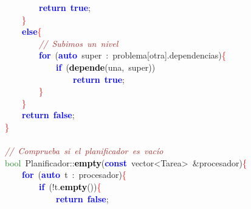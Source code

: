 \mbox{}\ \ \ \ \ \ \ \ \textbf{\textcolor{Blue}{return}}\ \textbf{\textcolor{Blue}{true}}\textcolor{BrickRed}{;} \\
\mbox{}\ \ \ \ \textcolor{Red}{\}} \\
\mbox{}\ \ \ \ \textbf{\textcolor{Blue}{else}}\textcolor{Red}{\{} \\
\mbox{}\ \ \ \ \ \ \ \ \textit{\textcolor{Brown}{//\ Subimos\ un\ nivel}} \\
\mbox{}\ \ \ \ \ \ \ \ \textbf{\textcolor{Blue}{for}}\ \textcolor{BrickRed}{(}\textbf{\textcolor{Blue}{auto}}\ super\ \textcolor{BrickRed}{:}\ problema\textcolor{BrickRed}{[}otra\textcolor{BrickRed}{].}dependencias\textcolor{BrickRed}{)}\textcolor{Red}{\{} \\
\mbox{}\ \ \ \ \ \ \ \ \ \ \ \ \textbf{\textcolor{Blue}{if}}\ \textcolor{BrickRed}{(}\textbf{\textcolor{Black}{depende}}\textcolor{BrickRed}{(}una\textcolor{BrickRed}{,}\ super\textcolor{BrickRed}{))} \\
\mbox{}\ \ \ \ \ \ \ \ \ \ \ \ \ \ \ \ \textbf{\textcolor{Blue}{return}}\ \textbf{\textcolor{Blue}{true}}\textcolor{BrickRed}{;} \\
\mbox{}\ \ \ \ \ \ \ \ \textcolor{Red}{\}} \\
\mbox{}\ \ \ \ \textcolor{Red}{\}} \\
\mbox{}\ \ \ \ \textbf{\textcolor{Blue}{return}}\ \textbf{\textcolor{Blue}{false}}\textcolor{BrickRed}{;} \\
\mbox{}\textcolor{Red}{\}} \\
\mbox{} \\
\mbox{}\textit{\textcolor{Brown}{//\ Comprueba\ si\ el\ planificador\ es\ vacío}} \\
\mbox{}\textcolor{ForestGreen}{bool}\ Planificador\textcolor{BrickRed}{::}\textbf{\textcolor{Black}{empty}}\textcolor{BrickRed}{(}\textbf{\textcolor{Blue}{const}}\ \textcolor{TealBlue}{vector\textless{}Tarea\textgreater{}}\ \textcolor{BrickRed}{\&}procesador\textcolor{BrickRed}{)}\textcolor{Red}{\{} \\
\mbox{}\ \ \ \ \textbf{\textcolor{Blue}{for}}\ \textcolor{BrickRed}{(}\textbf{\textcolor{Blue}{auto}}\ t\ \textcolor{BrickRed}{:}\ procesador\textcolor{BrickRed}{)}\textcolor{Red}{\{} \\
\mbox{}\ \ \ \ \ \ \ \ \textbf{\textcolor{Blue}{if}}\ \textcolor{BrickRed}{(!}t\textcolor{BrickRed}{.}\textbf{\textcolor{Black}{empty}}\textcolor{BrickRed}{())}\textcolor{Red}{\{} \\
\mbox{}\ \ \ \ \ \ \ \ \ \ \ \ \textbf{\textcolor{Blue}{return}}\ \textbf{\textcolor{Blue}{false}}\textcolor{BrickRed}{;} \\
